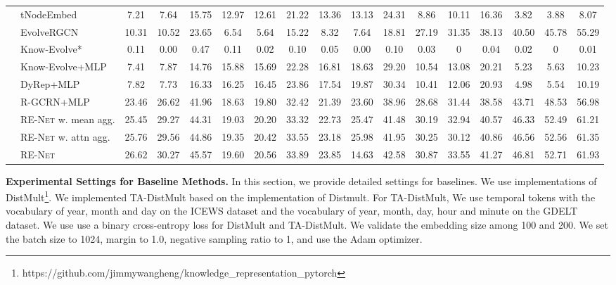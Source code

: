 \documentclass[11pt,a4paper]{article}
\newcommand{\method}{\textsc{RE-Net}\xspace}
\newcommand{\para}[1]{\smallskip\noindent\textbf{#1}}
\begin{document}
\begin{table}[tb!]
{\begin{tabular}{ll|ccc|ccc|ccc|ccc|ccc}
&tNodeEmbed             &7.21   &7.64   &15.75  &12.97  &12.61  &21.22  &13.36  &13.13  &24.31  &8.86   &10.11  &16.36  &3.82   &3.88   &8.07    \\
&EvolveRGCN             &10.31  &10.52  &23.65  &6.54   &5.64   &15.22  &8.32   &7.64   &18.81  &27.19  &31.35  &38.13  &40.50  &45.78  &55.29    \\
&Know-Evolve*           &0.11   &0.00   &0.47   &0.11   &0.02   &0.10   &0.05   &0.00   &0.10   &0.03   &0      &0.04   &0.02   &0	    &0.01    \\ 
&Know-Evolve+MLP        &7.41   &7.87   &14.76  &15.88  &15.69  &22.28  &16.81  &18.63  &29.20  &10.54  &13.08	&20.21  &5.23   &5.63   &10.23   \\ 
&DyRep+MLP              &7.82   &7.73   &16.33  &16.25  &16.45  &23.86  &17.54  &19.87  &30.34  &10.41  &12.06  &20.93  &4.98   &5.54   &10.19   \\ 
&R-GCRN+MLP             &23.46  &26.62  &41.96  &18.63  &19.80  &32.42  &21.39  &23.60  &38.96  &28.68  &31.44  &38.58  &43.71  &48.53  &56.98   \\ 
\cmidrule{2-17}
&\method w. mean agg.   &25.45  &29.27  &44.31  &19.03  &20.20  &33.32  &22.73  &25.47  &41.48  &30.19  &32.94  &40.57  &46.33  &52.49  &61.21   \\
&\method w. attn agg.   &25.76  &29.56  &44.86  &19.35  &20.42  &33.55  &23.18  &25.98  &41.95  &30.25  &30.12  &40.86  &46.56  &52.56  &61.35   \\
&\method                &26.62  &30.27  &45.57  &19.60  &20.56  &33.89  &23.85  &14.63  &42.58  &30.87  &33.55  &41.27  &46.81  &52.71  &61.93 \\
\cmidrule[1pt](){2-17}
\end{tabular}}
\end{table}

\para{Experimental Settings for Baseline Methods.}
In this section, we provide detailed settings for baselines.
We use implementations of DistMult\footnote{\scriptsize https://github.com/jimmywangheng/knowledge\_representation\_pytorch}.
We implemented TA-DistMult based on the implementation of Distmult.
For TA-DistMult, We use temporal tokens with the vocabulary of year, month and day on the ICEWS dataset and the vocabulary of year, month, day, hour and minute on the GDELT dataset. 
We use use a binary cross-entropy loss for DistMult and TA-DistMult.
We validate the embedding size among 100 and 200. 
We set the batch size to 1024, margin to 1.0, negative sampling ratio to 1, and use the Adam optimizer. 
\end{document}
